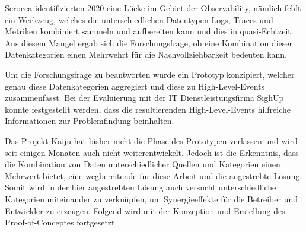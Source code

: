 Scrocca \etal \cite{TheKaijuProjectPaper} identifizierten 2020 eine Lücke im Gebiet der Observability, nämlich fehlt ein Werkzeug, welches die unterschiedlichen Datentypen Logs, Traces und Metriken kombiniert sammeln und aufbereiten kann und dies in quasi-Echtzeit. Aus diesem Mangel ergab sich die Forschungsfrage, ob eine Kombination dieser Datenkategorien einen Mehrwehrt für die Nachvollziehbarkeit bedeuten kann.

Um die Forschungsfrage zu beantworten wurde ein Prototyp konzipiert, welcher genau diese Datenkategorien aggregiert und diese zu High-Level-Events zusammenfasst. Bei der Evaluierung mit der IT Dienstleistungsfirma SighUp konnte festgestellt werden, dass die resultierenden High-Level-Events hilfreiche Informationen zur Problemfindung beinhalten.

Das Projekt Kaiju hat bisher nicht die Phase des Prototypen verlassen und wird seit einigen Monaten auch nicht weiterentwickelt\footnotemark{}. Jedoch ist die Erkenntnis, dass die Kombination von Daten unterschiedlicher Quellen und Kategorien einen Mehrwert bietet, eine wegbereitende für diese Arbeit und die angestrebte Lösung. Somit wird in der hier angestrebten Lösung auch versucht unterschiedliche Kategorien miteinander zu verknüpfen, um Synergieeffekte für die Betreiber und Entwickler zu erzeugen. Folgend wird mit der Konzeption und Erstellung des Proof-of-Conceptes fortgesetzt.


%
%
%
